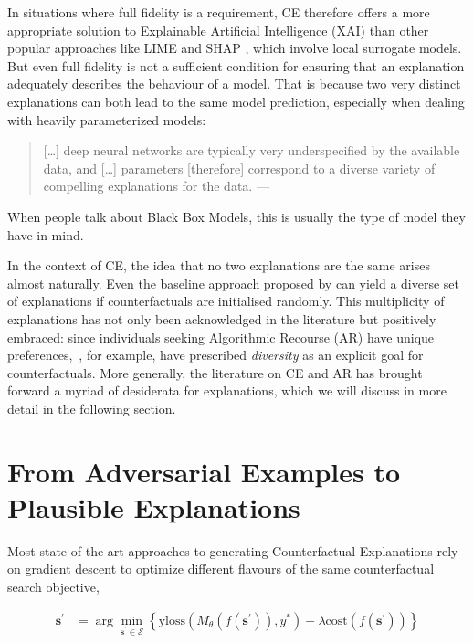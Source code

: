 \documentclass{article}
\begin{document}
In situations where full fidelity is a requirement, CE therefore offers a more appropriate solution to Explainable Artificial Intelligence (XAI) than other popular approaches like LIME \citep{ribeiro2016why} and SHAP \citep{lundberg2017unified}, which involve local surrogate models. But even full fidelity is not a sufficient condition for ensuring that an explanation adequately describes the behaviour of a model. That is because two very distinct explanations can both lead to the same model prediction, especially when dealing with heavily parameterized models:

\begin{quotation}
  […] deep neural networks are typically very underspecified by the available data, and […] parameters [therefore] correspond to a diverse variety of compelling explanations for the data.
  --- \citet{wilson2020case}
\end{quotation}

When people talk about Black Box Models, this is usually the type of model they have in mind. 

In the context of CE, the idea that no two explanations are the same arises almost naturally. Even the baseline approach proposed by \citet{wachter2017counterfactual} can yield a diverse set of explanations if counterfactuals are initialised randomly. This multiplicity of explanations has not only been acknowledged in the literature but positively embraced: since individuals seeking Algorithmic Recourse (AR) have unique preferences,~\citet{mothilal2020explaining}, for example, have prescribed \textit{diversity} as an explicit goal for counterfactuals. More generally, the literature on CE and AR has brought forward a myriad of desiderata for explanations, which we will discuss in more detail in the following section.

\section{From Adversarial Examples to Plausible Explanations}\label{background}

Most state-of-the-art approaches to generating Counterfactual Explanations rely on gradient descent to optimize different flavours of the same counterfactual search objective,

\begin{equation} \label{eq:general}
\begin{aligned}
\mathbf{s}^\prime &= \arg \min_{\mathbf{s}^\prime \in \mathcal{S}} \left\{  {\text{yloss}(M_{\theta}(f(\mathbf{s}^\prime)),y^*)}+ \lambda {\text{cost}(f(\mathbf{s}^\prime)) }  \right\} 
\end{aligned} 
\end{equation}
\end{document}
